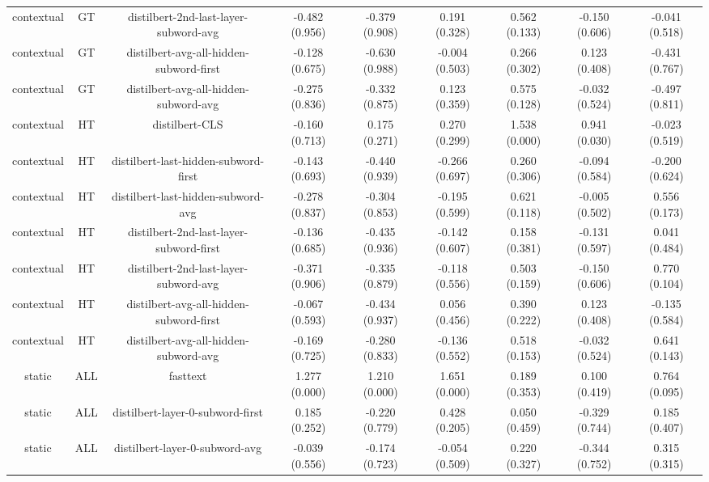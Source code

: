 \begin{sidewaystable}[htb]
\begin{tabular}{@{}ccccccccc@{}}
        contextual & GT & distilbert-2nd-last-layer-subword-avg & -0.482 (0.956) & -0.379 (0.908) & 0.191 (0.328) & 0.562 (0.133) & -0.150 (0.606) & -0.041 (0.518) \\
        contextual & GT & distilbert-avg-all-hidden-subword-first & -0.128 (0.675) & -0.630 (0.988) & -0.004 (0.503) & 0.266 (0.302) & 0.123 (0.408) & -0.431 (0.767) \\
        contextual & GT & distilbert-avg-all-hidden-subword-avg & -0.275 (0.836) & -0.332 (0.875) & 0.123 (0.359) & 0.575 (0.128) & -0.032 (0.524) & -0.497 (0.811) \\
        contextual & HT & distilbert-CLS & -0.160 (0.713) & 0.175 (0.271) & 0.270 (0.299) & 1.538 (0.000) & 0.941 (0.030) & -0.023 (0.519) \\
        contextual & HT & distilbert-last-hidden-subword-first & -0.143 (0.693) & -0.440 (0.939) & -0.266 (0.697) & 0.260 (0.306) & -0.094 (0.584) & -0.200 (0.624) \\
        contextual & HT & distilbert-last-hidden-subword-avg & -0.278 (0.837) & -0.304 (0.853) & -0.195 (0.599) & 0.621 (0.118) & -0.005 (0.502) & 0.556 (0.173) \\
        contextual & HT & distilbert-2nd-last-layer-subword-first & -0.136 (0.685) & -0.435 (0.936) & -0.142 (0.607) & 0.158 (0.381) & -0.131 (0.597) & 0.041 (0.484) \\
        contextual & HT & distilbert-2nd-last-layer-subword-avg & -0.371 (0.906) & -0.335 (0.879) & -0.118 (0.556) & 0.503 (0.159) & -0.150 (0.606) & 0.770 (0.104) \\
        contextual & HT & distilbert-avg-all-hidden-subword-first & -0.067 (0.593) & -0.434 (0.937) & 0.056 (0.456) & 0.390 (0.222) & 0.123 (0.408) & -0.135 (0.584) \\
        contextual & HT & distilbert-avg-all-hidden-subword-avg & -0.169 (0.725) & -0.280 (0.833) & -0.136 (0.552) & 0.518 (0.153) & -0.032 (0.524) & 0.641 (0.143) \\
        static & ALL & fasttext & 1.277 (0.000) & 1.210 (0.000) & 1.651 (0.000) & 0.189 (0.353) & 0.100 (0.419) & 0.764 (0.095) \\
        static & ALL & distilbert-layer-0-subword-first & 0.185 (0.252) & -0.220 (0.779) & 0.428 (0.205) & 0.050 (0.459) & -0.329 (0.744) & 0.185 (0.407) \\
        static & ALL & distilbert-layer-0-subword-avg & -0.039 (0.556) & -0.174 (0.723) & -0.054 (0.509) & 0.220 (0.327) & -0.344 (0.752) & 0.315 (0.315) \\

\end{tabular}
\end{sidewaystable}
